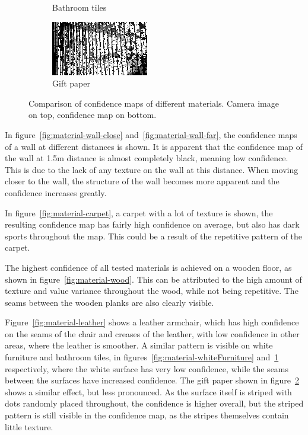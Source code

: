 \begin{figure}[h!tb]
\begin{subfigure}[b]{0.25\textwidth}
        \caption{Bathroom tiles}
        \label{fig:material-tiles}
    \end{subfigure}%
    \begin{subfigure}[b]{0.25\textwidth}
        \centering
        \includegraphics[width=0.9\linewidth]{images/materials/giftpaper-conf}
        \caption{Gift paper}
        \label{fig:material-giftpaper}
    \end{subfigure}%

    \caption{Comparison of confidence maps of different materials. Camera image on top, confidence map on bottom.}
    \label{fig:materials}
\end{figure}

In figure~\ref{fig:material-wall-close} and~\ref{fig:material-wall-far}, the confidence maps of a wall at different distances is shown.
It is apparent that the confidence map of the wall at 1.5m distance is almost completely black, meaning low confidence.
This is due to the lack of any texture on the wall at this distance.
When moving closer to the wall, the structure of the wall becomes more apparent and the confidence increases greatly.

In figure~\ref{fig:material-carpet}, a carpet with a lot of texture is shown, the resulting confidence map has fairly high confidence on average,
but also has dark sports throughout the map.
This could be a result of the repetitive pattern of the carpet.

The highest confidence of all tested materials is achieved on a wooden floor, as shown in figure~\ref{fig:material-wood}.
This can be attributed to the high amount of texture and value variance throughout the wood, while not being repetitive.
The seams between the wooden planks are also clearly visible.

Figure~\ref{fig:material-leather} shows a leather armchair, which has high confidence on the seams of the chair and
creases of the leather, with low confidence in other areas, where the leather is smoother.
A similar pattern is visible on white furniture and bathroom tiles, in figures~\ref{fig:material-whiteFurniture} and~\ref{fig:material-tiles} respectively,
where the white surface has very low confidence, while the seams between the surfaces have increased confidence.
The gift paper shown in figure~\ref{fig:material-giftpaper} shows a similar effect, but less pronounced.
As the surface itself is striped with dots randomly placed throughout, the confidence is higher overall,
but the striped pattern is still visible in the confidence map, as the stripes themselves contain little texture.


